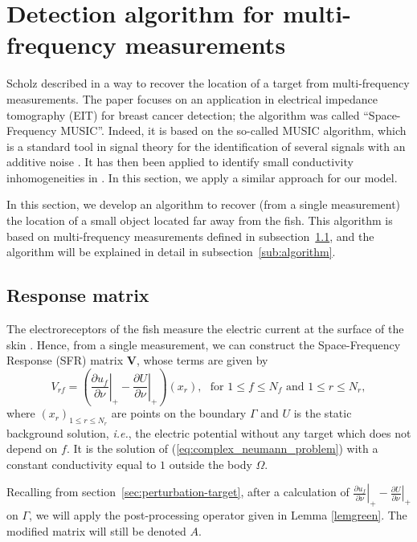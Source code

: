 \section{Detection algorithm for multi-frequency measurements}

\label{sec:detection_algo}

Scholz described in \cite{scholz2002towards} a way to recover the
location of a target from multi-frequency measurements. The paper
focuses on an application in electrical impedance tomography (EIT)
for breast cancer detection; the algorithm was called
``Space-Frequency MUSIC''. Indeed, it is based on the so-called
MUSIC algorithm, which is a standard tool in signal theory for the
identification of several signals with an additive noise
\cite{schmidt1986multiple, devaney2004super}. It has then been
applied to identify small conductivity inhomogeneities in
\cite{ammari2007identification, AKKLV2008music, bruhl2003direct}. In this section,
we apply a similar approach for our model.

In this section, we develop an algorithm to recover (from a single
measurement) the location of a small object located far away from
the fish. This algorithm is based on multi-frequency measurements defined in
subsection~\ref{sub:response-matrix}, and the algorithm will be explained in
detail in subsection~\ref{sub:algorithm}.

\subsection{Response matrix}

\label{sub:response-matrix}

The electroreceptors of the fish measure the electric current at
the surface of the skin \cite{moller1995electric}. Hence, from a single
measurement, we can construct the Space-Frequency Response (SFR)
matrix $\mathbf{V}$, whose terms are given by
\[
V_{rf}=\left(\left.\frac{\partial
u_{f}}{\partial\nu}\right|_{+}-\left.\frac{\partial
U}{\partial\nu}\right|_{+}\right)(x_{r}),\,\,\textrm{ for } 1\leq
f\leq N_f\textrm{ and }1\leq r\leq N_r,
\]
 where $\left(x_{r}\right)_{1\leq r\leq N_r}$ are points on the boundary
$\Gamma$ and $U$ is the static background solution, \emph{i.e.},
the electric potential without any target which does not depend on
$f$. It is the solution of (\ref{eq:complex_neumann_problem}) with
a constant conductivity equal to $1$ outside the body $\Omega$.

Recalling from section~\ref{sec:perturbation-target}, after a calculation of $\left.\frac{\partial
u_{f}}{\partial\nu}\right|_{+}-\left.\frac{\partial
U}{\partial\nu}\right|_{+}$ on $\Gamma$, we will apply the
post-processing operator given in Lemma \ref{lemgreen}. The
modified matrix will still be denoted $A$.

